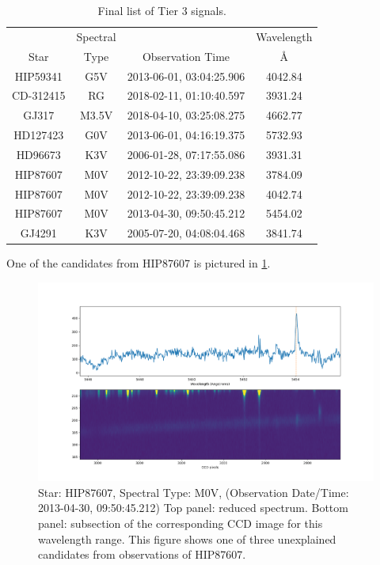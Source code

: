 \documentclass[twocolumn]{aastex701}
\begin{document}
\begin{table}
\begin{center}
\begin{tabular}{|c|c|c|c|} 
 \hline
& Spectral & & Wavelength\\
 Star & Type & Observation Time & \AA \\ 
\hline
 HIP59341 & G5V & 2013-06-01, 03:04:25.906 & 4042.84  \\
 CD-312415 & RG & 2018-02-11, 01:10:40.597 & 3931.24  \\ 
 GJ317 & M3.5V & 2018-04-10, 03:25:08.275 &  4662.77  \\ 
 HD127423 & G0V & 2013-06-01, 04:16:19.375 &  5732.93  \\
 HD96673 & K3V & 2006-01-28, 07:17:55.086 & 3931.31  \\
 HIP87607  & M0V & 2012-10-22, 23:39:09.238 & 3784.09  \\
 HIP87607  & M0V & 2012-10-22, 23:39:09.238 & 4042.74 \\
 HIP87607  & M0V & 2013-04-30, 09:50:45.212 & 5454.02 \\
 GJ4291 & K3V & 2005-07-20, 04:08:04.468 & 3841.74  \\
 \hline
 \end{tabular}
\end{center}
\caption{Final list of Tier 3 signals.}
\label{table:tier_3_candidates}
\end{table}

One of the candidates from HIP87607 is pictured in \ref{fig:seti_candidate_HIP87607}. 

\begin{figure}
    \centering  \includegraphics[width=\textwidth]{Mtype1.png}
    \caption{Star: HIP87607, Spectral Type: M0V, (Observation Date/Time: 2013-04-30, 09:50:45.212) Top panel: reduced spectrum. Bottom panel: subsection of the corresponding CCD image for this wavelength range.  This figure shows one of three unexplained candidates from observations of HIP87607.}
    \label{fig:seti_candidate_HIP87607}
\end{figure}
\end{document}

